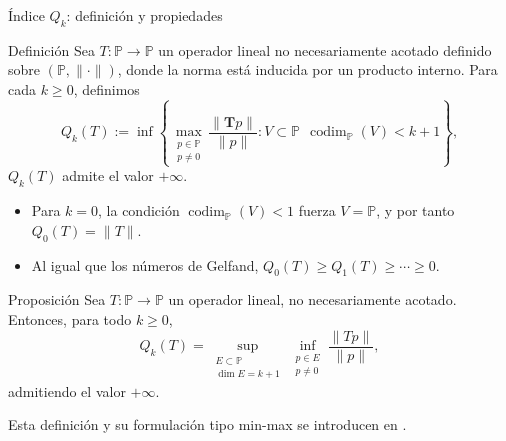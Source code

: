 \documentclass[aspectratio=169,10pt]{beamer}
\newcommand{\Poly}{\mathbb{P}}
\begin{document}
\begin{frame}{Índice \texorpdfstring{$Q_k$}{Qk}: definición y propiedades}
  \scriptsize
  \setlength{\abovedisplayskip}{2pt}
  \setlength{\belowdisplayskip}{2pt}
  \setlength{\abovedisplayshortskip}{1pt}
  \setlength{\belowdisplayshortskip}{1pt}
  \begin{block}{Definición}
    Sea \(T:\Poly\to\Poly\) un operador lineal no necesariamente acotado definido sobre \((\Poly,\|\cdot\|)\), donde la norma está inducida por un producto interno. Para cada \(k\ge0\), definimos
    \[
      Q_k(T)
      :=\inf\left\{\max_{\substack{p\in \Poly\\ p\neq0}}
      \frac{\|\mathbf Tp\|}{\|p\|}:V\subset\Poly\ \ \operatorname{codim}_{\Poly}(V)<k+1\right\},
    \]
    \(Q_k(T)\) admite el valor \(+\infty\).
  \end{block}

  \begin{itemize}
    \setlength{\itemsep}{0pt}
          \setlength{\parskip}{0pt}
    \item Para \(k=0\), la condición \(\operatorname{codim}_{\Poly}(V)<1\) fuerza \(V=\Poly\), y por tanto \(Q_0(T)=\|T\|\).
    \item Al igual que los números de Gelfand, \(Q_0(T)\ge Q_1(T)\ge\cdots\ge0\).
  \end{itemize}

  \vspace{-1mm}
  \begin{block}{Proposición}
    Sea \(T:\Poly\to\Poly\) un operador lineal, no necesariamente acotado. Entonces, para todo \(k\ge0\),
    \[
      Q_k(T)
      =
      \sup_{\substack{E\subset\Poly\\ \dim E=k+1}}
      \inf_{\substack{p\in E\\ p\ne0}}
      \frac{\|Tp\|}{\|p\|},
    \]
    admitiendo el valor \(+\infty\).
  \end{block}

  {\scriptsize Esta definición y su formulación tipo min-max se introducen en \cite{EGS-preprint}.}
\end{frame}
\end{document}
